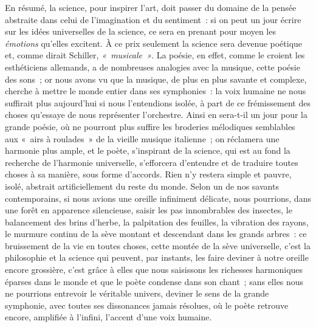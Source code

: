 \documentclass[french,twoside]{book} %
\begin{document}
\par
En résumé, la science, pour inspirer l’art, doit passer du domaine de la pensée abstraite dans celui de l’imagination et du sentiment : si on peut un jour écrire sur les idées universelles de la science, ce sera en prenant pour moyen les \emph{émotions} qu’elles excitent. À ce prix seulement la science sera devenue poétique et, comme dirait Schiller, \emph{« musicale »}. La poésie, en effet, comme le croient les esthéticiens allemands, a de nombreuses analogies avec la musique, cette poésie des sons ; or nous avons vu que la musique, de plus en plus savante et complexe, cherche à mettre le monde entier dans ses symphonies : la voix humaine ne nous suffirait plus aujourd’hui si nous l’entendions isolée, à part de ce frémissement des choses qu’essaye de nous représenter l’orchestre. Ainsi en sera-t-il un jour pour la grande poésie, où ne pourront plus suffire les broderies mélodiques semblables aux « airs à roulades » de la vieille musique italienne ; on réclamera une harmonie plus ample, et le poète, s’inspirant de la science, qui est au fond la recherche de l’harmonie universelle, s’efforcera d’entendre et de traduire toutes choses à sa manière, sous forme d’accords. Rien n’y restera simple et pauvre, isolé, abstrait artificiellement du reste du monde. Selon un de nos savants contemporains, si nous avions une oreille infiniment délicate, nous pourrions, dans une forêt en apparence silencieuse, saisir les pas innombrables des insectes, le  balancement des brins d’herbe, la palpitation des feuilles, la vibration des rayons, le murmure continu de la sève montant et descendant dans les grands arbres : ce bruissement de la vie en toutes choses, cette montée de la sève universelle, c’est la philosophie et la science qui peuvent, par instants, les faire deviner à notre oreille encore grossière, c’est grâce à elles que nous saisissons les richesses harmoniques éparses dans le monde et que le poète condense dans son chant ; sans elles nous ne pourrions entrevoir le véritable univers, deviner le sens de la grande symphonie, avec toutes ses dissonances jamais résolues, où le poète retrouve encore, amplifiée à l’infini, l’accent d’une voix humaine.\par
\end{document}

